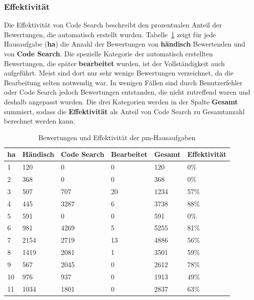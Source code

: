 \subsubsection{Effektivität}

Die Effektivität von Code Search beschreibt den prozentualen Anteil der Bewertungen, die automatisch erstellt wurden.
Tabelle~\ref{tbl:pm-effectiveness} zeigt für jede Hausaufgabe (\textbf{\acs{ha}}) die Anzahl der Bewertungen von \textbf{händisch} Bewertenden und von \textbf{Code Search}.
Die spezielle Kategorie der automatisch erstellten Bewertungen, die später \textbf{bearbeitet} wurden, ist der Vollständigkeit auch aufgeführt.
Meist sind dort nur sehr wenige Bewertungen verzeichnet, da die Bearbeitung selten notwendig war.
In wenigen Fällen sind durch Benutzerfehler oder Code Search jedoch Bewertungen entstanden, die nicht zutreffend waren und deshalb angepasst wurden.
Die drei Kategorien werden in der Spalte \textbf{Gesamt} summiert, sodass die \textbf{Effektivität} als Anteil von Code Search zu Gesamtanzahl berechnet werden kann.

\begin{table}
    \centering
    \caption{Bewertungen und Effektivität der \ac{pm}-Hausaufgaben}
    \begin{tabular}{|l|l|l|l|l|l|}
    \hline
        \acs{ha} & Händisch & Code Search & Bearbeitet & Gesamt & Effektivität  \\ \hline
        1   & 120  & 0    & 0  & 120  &  0\%  \\ \hline
        2   & 368  & 0    & 0  & 368  &  0\%  \\ \hline
        3   & 507  & 707  & 20 & 1234 & 57\%  \\ \hline
        4   & 445  & 3287 & 6  & 3738 & 88\%  \\ \hline
        5   & 591  & 0    & 0  & 591  &  0\%  \\ \hline
        6   & 981  & 4269 & 5  & 5255 & 81\%  \\ \hline
        7   & 2154 & 2719 & 13 & 4886 & 56\%  \\ \hline
        8   & 1419 & 2081 & 1  & 3501 & 59\%  \\ \hline
        9   & 567  & 2045 & 0  & 2612 & 78\%  \\ \hline
        10  & 976  & 937  & 0  & 1913 & 49\%  \\ \hline
        11  & 1034 & 1801 & 0  & 2837 & 63\%  \\ \hline
    \end{tabular}
    \label{tbl:pm-effectiveness}
\end{table}

